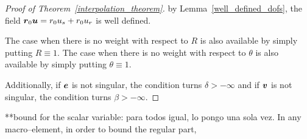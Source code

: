 \begin{proof}[Proof of Theorem~\ref{interpolation_theorem}]
by Lemma~\ref{well_defined_dofs}, the field $\boldsymbol{r}_{0}\boldsymbol{u} = r_0u_s + r_0u_r$ is well defined.

{\color{BrickRed}The case when there is no weight with respect to $R$ is also available by simply putting 
$R\equiv 1.$
The case when there is no weight with respect to $\theta$ is also available by simply putting 
$\theta\equiv 1.$

Additionally, if $\boldsymbol{e}$ is not singular, the condition turns $\delta > -\infty$
and if $\boldsymbol{v}$ is not singular, the condition turns $\beta > -\infty.$}
\end{proof} 
**bound for the scalar variable: para todos igual, 
lo pongo una sola vez.
In any macro--element, in order to bound the regular part,

